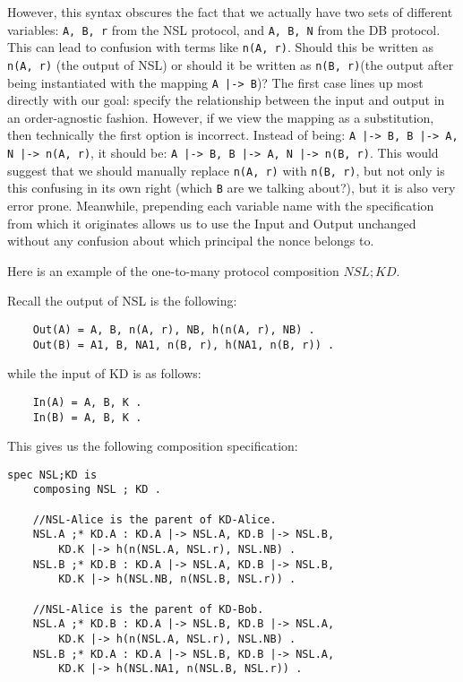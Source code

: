 \documentclass{article}
\begin{document}
However, this syntax obscures
the fact that we actually have two sets of different variables: 
\verb|A, B, r| from the NSL protocol, and \verb|A, B, N| from the DB protocol.
This can lead to confusion with terms like \verb|n(A, r)|. Should this be
written as \verb|n(A, r)| (the output of NSL) or should it be written as
\verb|n(B, r)|(the output after being instantiated with the mapping 
\verb#A |-> B#)? The first case lines up most directly with our goal:
specify the relationship between the input and output in an order-agnostic 
fashion. 
However, if we view the mapping as a substitution, then technically the first
option is incorrect. Instead of being:
\verb#A |-> B, B |-> A, N |-> n(A, r)#, it should
be: \verb#A |-> B, B |-> A, N |-> n(B, r)#. This would suggest that we should
manually replace \verb|n(A, r)| with \verb|n(B, r)|, but not only is this
confusing in its own right (which \verb|B| are we talking about?), but it is
also very error prone. Meanwhile, prepending each variable name with the 
specification from which it originates allows us to use the Input and Output
unchanged without any confusion about which principal the nonce belongs to.

Here is an example of the one-to-many protocol composition 
$\mathit{NSL};\mathit{KD}$.

Recall the output of NSL is the following:

\begin{verbatim}
    Out(A) = A, B, n(A, r), NB, h(n(A, r), NB) .
    Out(B) = A1, B, NA1, n(B, r), h(NA1, n(B, r)) .
\end{verbatim}

while the input of KD is as follows:

\begin{verbatim}
    In(A) = A, B, K .
    In(B) = A, B, K .
\end{verbatim}

This gives us the following composition specification:

\begin{verbatim}
spec NSL;KD is
    composing NSL ; KD .

    //NSL-Alice is the parent of KD-Alice.
    NSL.A ;* KD.A : KD.A |-> NSL.A, KD.B |-> NSL.B, 
        KD.K |-> h(n(NSL.A, NSL.r), NSL.NB) .
    NSL.B ;* KD.B : KD.A |-> NSL.A, KD.B |-> NSL.B, 
        KD.K |-> h(NSL.NB, n(NSL.B, NSL.r)) .

    //NSL-Alice is the parent of KD-Bob.
    NSL.A ;* KD.B : KD.A |-> NSL.B, KD.B |-> NSL.A, 
        KD.K |-> h(n(NSL.A, NSL.r), NSL.NB) .
    NSL.B ;* KD.A : KD.A |-> NSL.B, KD.B |-> NSL.A, 
        KD.K |-> h(NSL.NA1, n(NSL.B, NSL.r)) .

\end{verbatim}
\end{document}
